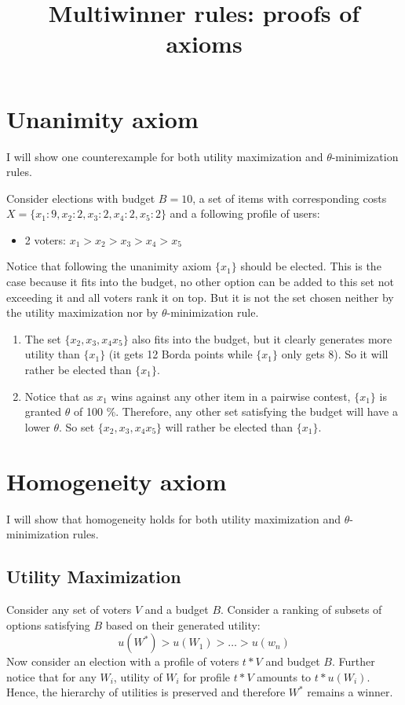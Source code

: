 \documentclass{article}
\title{Multiwinner rules: proofs of axioms}
\begin{document}
\maketitle

\section{Unanimity axiom}
I will show one counterexample for both utility maximization and $\theta$-minimization rules.

Consider elections with budget $B=10$, a set of items with corresponding costs $X= \{x_1:9, x_2:2, x_3:2, x_4:2, x_5:2\}$ and a following profile of users:
\begin{itemize}
\item 2 voters: $x_1 > x_2 >x_3 > x_4 > x_5$
\end{itemize}
 Notice that following the unanimity axiom $\{x_1 \}$ should be elected. This is the case because it fits into the budget, no other option can be added to this set not exceeding it and all voters rank it on top. But it is not the set chosen neither by the utility maximization nor by $\theta$-minimization rule.
 
\begin{enumerate}
\item The set $\{x_2, x_3, x_4 x_5 \}$ also fits into the budget, but it clearly generates more utility than $\{ x_1\}$ (it gets 12 Borda points while $\{ x_1\}$ only gets 8). So it will rather be elected than $\{x_1 \}$. 
\item Notice that as $x_1$ wins against any other item in a pairwise contest, $\{x_1 \}$ is granted $\theta$ of 100 \%. Therefore, any other set satisfying the budget will have a lower $\theta$. So set $\{x_2, x_3, x_4 x_5 \}$ will rather be elected than $\{x_1 \}$.
\end{enumerate}
\section{Homogeneity axiom}
I will show that homogeneity holds for both utility maximization and $\theta$-minimization rules.
\subsection{Utility Maximization}
Consider any set of voters $V$ and a budget $B$. Consider a ranking of subsets of options satisfying $B$ based on their generated utility:
$$ u(W^*) > u(W_1) > \dots > u(w_n)$$
Now consider an election with a profile of voters $t*V$ and budget $B$. Further notice that for any $W_i$, utility of $W_i$ for profile $t*V$ amounts to $t*u(W_i)$. Hence, the hierarchy of utilities is preserved and therefore $W^*$ remains a winner.
\end{document}
